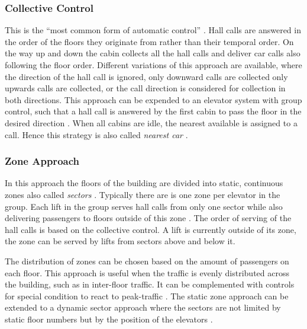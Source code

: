 \subsubsection{Collective Control}
This is the \enquote{most common form of automatic control} \autocite[][p.~237]{barney2016handbook}.
Hall calls are answered in the order of the floors they originate from rather than their temporal order.
On the way up and down the cabin collects all the hall calls and deliver car calls also following the floor order.
Different variations of this approach are available, where the direction of the hall call is ignored, only downward calls are collected only upwards calls are collected, or the call direction is considered for collection in both directions.
This approach can be expended to an elevator system with group control, such that a hall call is answered by the first cabin to pass the floor in the desired direction \autocite[][p.~238]{barney2016handbook}.
When all cabins are idle, the nearest available is assigned to a call. Hence this strategy is also called \emph{nearest car}
\autocite[][p.~244]{barney2016handbook}.

\subsubsection{Zone Approach}
In this approach the floors of the building are divided into static, continuous zones also called \emph{sectors} \autocite[][p.~247]{barney2016handbook}. 
Typically there are is one zone per elevator in the group. 
Each lift in the group serves hall calls from only one sector
while also delivering passengers to floors outside of this zone
\autocite[][pp.~3--6]{axelsson2013strategies}.
The order of serving of the hall calls is based on the collective control.
A lift is currently outside of its zone, 
the zone can be served by lifts from sectors above and below it.

The distribution of zones can be chosen based on the amount of passengers on each floor.
This approach is useful when the traffic is evenly distributed across the building, such as in inter-floor traffic. It can be complemented with controls for special condition to react to peak-traffic \autocite[][p.~247]{barney2016handbook}.
The static zone approach can be extended to a dynamic sector approach where the sectors are not limited by static floor numbers but by the position of the elevators \autocite[][p.~250]{barney2016handbook}.

